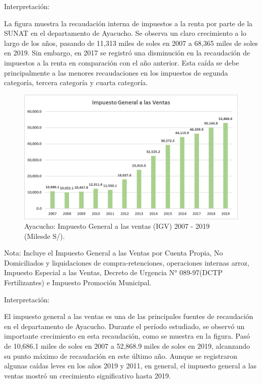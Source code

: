 \documentclass[
  letterpaper,
  DIV=11,
  numbers=noendperiod]{scrartcl}
\begin{document}
Interpretación:

La figura muestra la recaudación interna de impuestos a la renta por
parte de la SUNAT en el departamento de Ayacucho. Se observa un claro
crecimiento a lo largo de los años, pasando de 11,313 miles de soles en
2007 a 68,365 miles de soles en 2019. Sin embargo, en 2017 se registró
una disminución en la recaudación de impuestos a la renta en comparación
con el año anterior. Esta caída se debe principalmente a las menores
recaudaciones en los impuestos de segunda categoría, tercera categoría y
cuarta categoría.

\begin{figure}

\caption{\label{fig-2}Ayacucho: Impuesto General a las ventas (IGV) 2007
- 2019 (Milesde S/).}

{\centering \includegraphics{20230603225447.png}

}

\end{figure}

Nota: Incluye el Impuesto General a las Ventas por Cuenta Propia, No
Domiciliados y liquidaciones de compra-retenciones, operaciones internas
arroz, Impuesto Especial a las Ventas, Decreto de Urgencia N°
089-97(DCTP Fertilizantes) e Impuesto Promoción Municipal.

Interpretación:

El impuesto general a las ventas es una de las principales fuentes de
recaudación en el departamento de Ayacucho. Durante el período
estudiado, se observó un importante crecimiento en esta recaudación,
como se muestra en la figura. Pasó de 10,686.1 miles de soles en 2007 a
52,868.9 miles de soles en 2019, alcanzando su punto máximo de
recaudación en este último año. Aunque se registraron algunas caídas
leves en los años 2019 y 2011, en general, el impuesto general a las
ventas mostró un crecimiento significativo hasta 2019.
\end{document}
